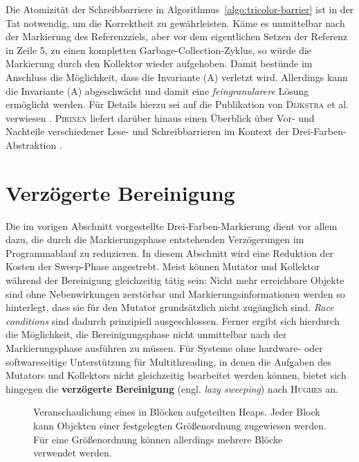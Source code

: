 Die Atomizität der Schreibbarriere  in Algorithmus~\ref{algo:tricolor-barrier} ist in der Tat notwendig, um die Korrektheit zu gewährleisten.
Käme es unmittelbar nach der Markierung des Referenzziels, aber vor dem eigentlichen Setzen der Referenz in Zeile 5, zu einen kompletten Garbage-Collection-Zyklus, so würde die Markierung durch den Kollektor wieder aufgehoben.
Damit bestünde im Anschluss die Möglichkeit, dass die Invariante (A) verletzt wird.
Allerdings kann die Invariante (A) abgeschwächt und damit eine \textit{feingranularere} Lösung ermöglicht werden.
Für Details hierzu sei auf die Publikation von \textsc{Dijkstra} et al. verwiesen \cite[S. 972ff]{dijkstra1978}.
\textsc{Pirinen} liefert darüber hinaus einen Überblick über Vor- und Nachteile verschiedener Lese- und Schreibbarrieren im Kontext der Drei-Farben-Abstraktion \cite{pirinen}.




\section{Verzögerte Bereinigung}
\label{sec:lazy-sweep}
Die im vorigen Abschnitt vorgestellte Drei-Farben-Markierung dient vor allem dazu, die durch die Markierungsphase entstehenden Verzögerungen im Programmablauf zu reduzieren.
In diesem Abschnitt wird eine Reduktion der Kosten der Sweep-Phase angestrebt.
Meist können Mutator und Kollektor während der Bereinigung gleichzeitig tätig sein:
Nicht mehr erreichbare Objekte sind ohne Nebenwirkungen zerstörbar und Markierungsinformationen werden so hinterlegt, dass sie für den Mutator grundsätzlich nicht zugänglich sind.
\textit{Race conditions} sind dadurch prinzipiell ausgeschlossen.
Ferner ergibt sich hierdurch die Möglichkeit, die Bereinigungsphase nicht unmittelbar nach der Markierungsphase ausführen zu müssen.
Für Systeme ohne hardware- oder softwareseitige Unterstützung für Multithreading, in denen die Aufgaben des Mutators und Kollektors nicht gleichzeitig bearbeitet werden können, bietet sich hingegen die \textbf{verzögerte Bereinigung} (engl. \textit{lazy sweeping}) nach \textsc{Hughes} \cite{hughes} an.

\begin{figure}[h]
	\centering
	
	\caption[Veranschaulichung eines in Blöcken aufgeteilten Heaps]{Veranschaulichung eines in Blöcken aufgeteilten Heaps. Jeder Block kann Objekten einer festgelegten Größenordnung zugewiesen werden. Für eine Größenordnung können allerdings mehrere Blöcke verwendet werden.}
	\label{fig:heap-region}
\end{figure}


